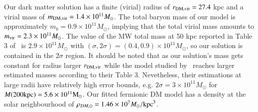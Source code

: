 \documentclass[twocolumn]{aa}
\begin{document}
Our dark matter solution has a finite (virial) radius of $r_{\rm{DM,vir}}=27.4$ kpc and a virial mass
of $m_{\rm{DM,vir}}=1.4\times10^{11} M_\odot$. The total baryon mass of our model is approximately
$m_b=0.9\times10^{11}M_\odot$, implying that the total virial mass amounts to
$m_{\rm{vir}}=2.3\times10^{11} M_\odot$. The value of the MW total mass at 50 kpc reported in Table 3
of~\citet{2014MNRAS.445.3788G} is $2.9\times10^{11} M_\odot$ with $(\sigma, 2\sigma)=(0.4,0.9)\times10^{11} M_\odot$, so our solution is contained in the $2\sigma$ region.
It should be noted that as our solution's mass gets constant for radius larger
$r_{\rm{DM,vir}}$ while the model studied by~\citet{2014MNRAS.445.3788G} reaches larger estimated
masses according to their Table 3. Nevetheless, their estimations at large radii have relatively
high error bounds, e.g. $2\sigma=3\times10^{11} M_\odot$ for $M(200\rm{kpc})=5.6\times10^{11} M_\odot$.
Our fitted fermionic DM model has a density at the solar neighbourhood of $\rho_{DM,\odot}=1.46\times10^7 M_\odot/\rm{kpc}^3$.
\end{document}
